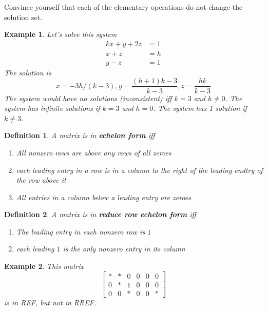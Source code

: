 \documentclass[11pt]{article}
\newtheorem{defn}{Definition}
\newtheorem{ex}{Example}
\begin{document}
        Convince yourself that each of the elementary operations do not change the solution
        set.
        \begin{ex}
          Let's solve this system
          \begin{align*}
            kx + y + 2z &=1 \\
            x + z &= h \\
            y-z &= 1
            \end{align*}
            The solution is
            \[x=-3h/(k-3), y=\frac{(h+1)k-3}{k-3}, z = \frac{hk}{k-3}\]
            The system would have no solutions (inconsistent) iff $k=3$ and $h \neq 0$.
            The system has infinite solutions if $k=3$ and $h= 0$.
            The system has 1 solution if $k \neq 3$.
          \end{ex}
          \begin{defn}
            A matrix is in \textbf{echelon form} iff
            \begin{enumerate}
              \item All nonzero rows are above any rows of all zeroes
              \item each leading entry in a row is in a column to the right of the leading
                    endtry of the row above it
                \item All entries in a column below a leading entry are zeroes
            \end{enumerate}
          \end{defn}
          \begin{defn}
            A matrix is in \textbf{reduce row echelon form} iff
            \begin{enumerate}
              \item The leading entry in each nonzero row is $1$
                    \item each leading $1$ is the only nonzero entry in its column
                    \end{enumerate}
            \end{defn}
            \begin{ex}
              This matrix
              \[
                \begin{bmatrix}
                  * & * & 0 & 0 & 0 & 0 \\
                  0 & * & 1 & 0 & 0 & 0 \\
                  0 & 0 & * & 0 & 0 & *
                  \end{bmatrix}
                \]
                is in REF, but not in RREF.
              \end{ex}
\end{document}
